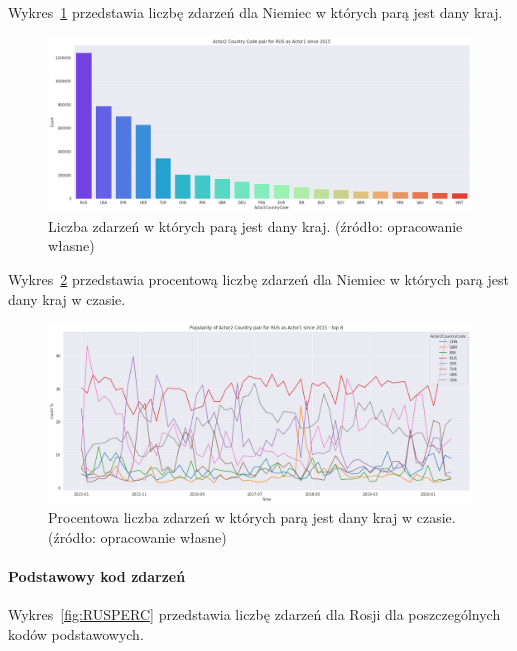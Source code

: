 \documentclass[11pt]{report}
\begin{document}
    Wykres~\ref{fig:RUSpair} przedstawia liczbę zdarzeń dla Niemiec w których parą jest dany kraj.

    \begin{figure}[!htp]
        \centering
        \includegraphics[width=\linewidth]{fig/RUS/RUSactor2Pair.png}
        \caption{Liczba zdarzeń w których parą jest dany kraj. (źródło: opracowanie własne)}
        \label{fig:RUSpair}
    \end{figure}


    Wykres~\ref{fig:RUSpairPerc} przedstawia procentową liczbę zdarzeń dla Niemiec w których parą jest dany kraj w czasie.
    \begin{figure}[!htp]
        \centering
        \includegraphics[width=\linewidth]{fig/RUS/RUSactor2PairPercinTIME.png}
        \caption{Procentowa liczba zdarzeń w których parą jest dany kraj w czasie. (źródło: opracowanie własne)}
        \label{fig:RUSpairPerc}
    \end{figure}

    \paragraph{Podstawowy kod zdarzeń}

    Wykres~\ref{fig:RUSPERC} przedstawia liczbę zdarzeń dla Rosji dla poszczególnych kodów podstawowych.
\end{document}

